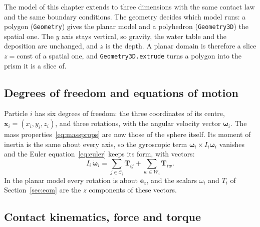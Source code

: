 The model of this chapter extends to three dimensions with the same contact law and the same boundary conditions.
The geometry decides which model runs: a polygon (\texttt{Geometry}) gives the planar model and a polyhedron (\texttt{Geometry3D}) the spatial one.
The $y$ axis stays vertical, so gravity, the water table and the deposition are unchanged, and $z$ is the depth.
A planar domain is therefore a slice $z=\text{const}$ of a spatial one, and \texttt{Geometry3D.extrude} turns a polygon into the prism it is a slice of.

\subsection{Degrees of freedom and equations of motion}

Particle $i$ has six degrees of freedom: the three coordinates of its centre, $\mathbf{x}_{i}=(x_{i},y_{i},z_{i})$, and three rotations, with the angular velocity vector $\boldsymbol{\omega}_{i}$.
The mass properties~\eqref{eq:massprops} are now those of the sphere itself.
Its moment of inertia is the same about every axis, so the gyroscopic term $\boldsymbol{\omega}_{i}\times I_{i}\boldsymbol{\omega}_{i}$ vanishes and the Euler equation~\eqref{eq:euler} keeps its form, with vectors:
\begin{equation}
  I_{i}\,\dot{\boldsymbol{\omega}}_{i}
    = \sum_{j\in\mathcal{C}_{i}} \mathbf{T}_{ij}
     + \sum_{w\in\mathcal{W}_{i}} \mathbf{T}_{iw}.
  \label{eq:euler-3d}
\end{equation}
In the planar model every rotation is about $\mathbf{e}_{z}$, and the scalars $\omega_{i}$ and $T_{i}$ of Section~\ref{sec:eom} are the $z$ components of these vectors.

\subsection{Contact kinematics, force and torque}

